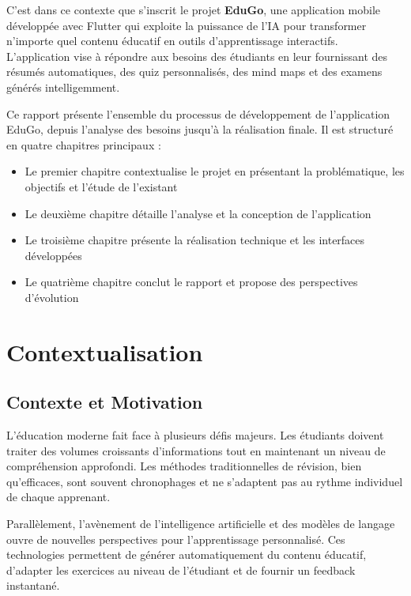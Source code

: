 \documentclass[12pt,a4paper]{report}
\begin{document}
C'est dans ce contexte que s'inscrit le projet \textbf{EduGo}, une application mobile développée avec Flutter qui exploite la puissance de l'IA pour transformer n'importe quel contenu éducatif en outils d'apprentissage interactifs. L'application vise à répondre aux besoins des étudiants en leur fournissant des résumés automatiques, des quiz personnalisés, des mind maps et des examens générés intelligemment.

Ce rapport présente l'ensemble du processus de développement de l'application EduGo, depuis l'analyse des besoins jusqu'à la réalisation finale. Il est structuré en quatre chapitres principaux :

\begin{itemize}
    \item Le premier chapitre contextualise le projet en présentant la problématique, les objectifs et l'étude de l'existant
    \item Le deuxième chapitre détaille l'analyse et la conception de l'application
    \item Le troisième chapitre présente la réalisation technique et les interfaces développées
    \item Le quatrième chapitre conclut le rapport et propose des perspectives d'évolution
\end{itemize}

\chapter{Contextualisation}

\section{Contexte et Motivation}

L'éducation moderne fait face à plusieurs défis majeurs. Les étudiants doivent traiter des volumes croissants d'informations tout en maintenant un niveau de compréhension approfondi. Les méthodes traditionnelles de révision, bien qu'efficaces, sont souvent chronophages et ne s'adaptent pas au rythme individuel de chaque apprenant.

Parallèlement, l'avènement de l'intelligence artificielle et des modèles de langage ouvre de nouvelles perspectives pour l'apprentissage personnalisé. Ces technologies permettent de générer automatiquement du contenu éducatif, d'adapter les exercices au niveau de l'étudiant et de fournir un feedback instantané.
\end{document}
